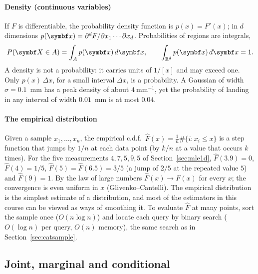\documentclass[11pt]{article}
\begin{document}
\paragraph{Density (continuous variables)} If $F$ is differentiable, the probability density function is
$p(x) = F'(x)$; in $d$ dimensions $p(\x) = \partial^d F/\partial x_1 \cdots \partial x_d$. Probabilities of
regions are integrals,
\[
  P(\X \in A) = \int_A p(\x)\, d\x, \qquad \int_{\R^d} p(\x)\,d\x = 1 .
\]
A density is not a probability: it carries units of $1/[x]$ and may exceed one. Only $p(x)\,\Delta x$, for a small
interval $\Delta x$, is a probability. A Gaussian of width $\sigma = 0.1$~mm has a peak density of about
$4\ \mathrm{mm}^{-1}$, yet the probability of landing in any interval of width $0.01$~mm is at most $0.04$.

\paragraph{The empirical distribution} Given a sample $x_1, \dots, x_n$, the empirical c.d.f.\
$\hat F(x) = \frac{1}{n}\#\{i : x_i \le x\}$ is a step function that jumps by $1/n$ at each data point (by $k/n$ at a
value that occurs $k$ times). For the five measurements $4, 7, 5, 9, 5$ of Section~\ref{sec:mle1d}, $\hat F(3.9) = 0$,
$\hat F(4) = 1/5$, $\hat F(5) = \hat F(6.5) = 3/5$ (a jump of $2/5$ at the repeated value $5$) and $\hat F(9) = 1$. By the law
of large numbers $\hat F(x) \to F(x)$ for every $x$; the convergence is even uniform in $x$ (Glivenko--Cantelli).
The empirical distribution is the simplest estimate of a distribution, and most of the estimators in this course
can be viewed as ways of smoothing it. To evaluate $\hat F$ at many points, sort the sample once ($O(n\log n)$)
and locate each query by binary search ($O(\log n)$ per query, $O(n)$ memory), the same search as in
Section~\ref{sec:catsample}.

\subsection{Joint, marginal and conditional}\label{sec:joint}
\end{document}
